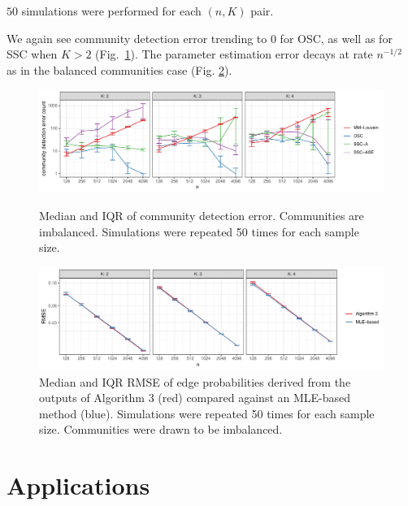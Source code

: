 \documentclass[12pt]{article}
\begin{document}
\(50\) simulations were performed for each \((n, K)\) pair.

We again see community detection error trending to 0 for OSC, as well as
for SSC when \(K > 2\) (Fig.~\ref{fig:clust_err_ct_sim_imba}). 
The parameter estimation error decays at rate $n^{-1/2}$ as in the balanced communities case
(Fig. \ref{fig:lambda_est_p_imba}). 

\begin{figure}[H]

{\centering \includegraphics{summary_files/figure-latex/clust_err_ct_sim_imba-1}
}

\caption{Median and IQR of community detection error. Communities are imbalanced. Simulations were repeated 50 times for each sample size.}\label{fig:clust_err_ct_sim_imba}
\end{figure}

\begin{figure}[H]

{\centering \includegraphics{summary_files/figure-latex/lambda_est_p_imba-1}

}

\caption{Median and IQR RMSE of edge probabilities derived from the outputs of Algorithm 3 (red) compared against an MLE-based method (blue). Simulations were repeated 50 times for each sample size. Communities were drawn to be imbalanced.}
\label{fig:lambda_est_p_imba}
\end{figure}

\hypertarget{real-data-examples}{%
\section{Applications}\label{real-data-examples}}
\end{document}
